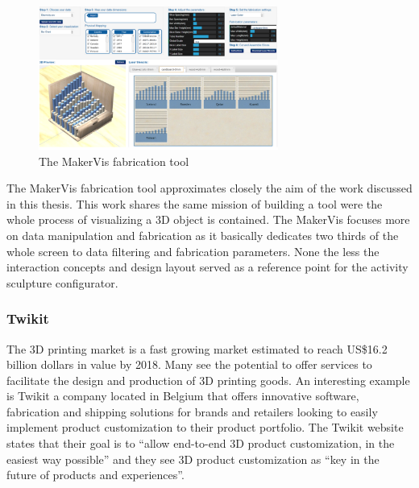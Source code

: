 \documentclass[../medieninformatik-arbeit.tex]{subfiles}
\begin{document}
\begin{figure}[h]
\begin{center}
  \includegraphics[width=0.7\textwidth]{RelatedWork/img/MakerVis}
  \caption{The MakerVis fabrication tool\cite{swaminathan2014supporting} }
\label{fig:makervis-config}
\end{center}
\end{figure}

The MakerVis fabrication tool approximates closely the aim of the work discussed in this thesis. This work shares the same mission of building a tool were the whole process of visualizing a 3D object is contained. The MakerVis focuses more on data manipulation and fabrication as it basically dedicates two thirds of the whole screen to data filtering and fabrication parameters. None the less the interaction concepts and design layout served as a reference point for the activity sculpture configurator. 

\subsubsection{Twikit}
The 3D printing market is a fast growing market estimated to reach US\$16.2 billion dollars in value by 2018\cite{canalys2014trends}. Many see the potential to offer services to facilitate the design and production of 3D printing goods. An interesting example is 
Twikit\cite{twikit2015tech} a company located in Belgium that offers innovative software, fabrication and shipping solutions for brands and retailers looking to easily implement product customization to their product portfolio. The Twikit website states that their goal is to ``allow end-to-end 3D product customization, in the easiest way possible'' and they see 3D product customization as ``key in the future of products and experiences''.
\end{document}
